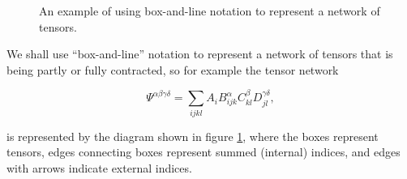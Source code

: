 \documentclass[12pt]{amsbook}
\theoremstyle{plain}
\theoremstyle{definition}
\theoremstyle{remark}
\begin{document}
\begin{figure}
\caption{An example of using box-and-line notation to represent a network of tensors.}
\label{fig:box-line-notation-introduced}
\end{figure}

We shall use ``box-and-line'' notation to represent a network of tensors that is being partly or fully contracted, so for example the tensor network

$$\Psi^{\alpha\beta\gamma\delta} = \sum_{ijkl} A_{i} B_{ijk}^\alpha C_{kl}^\beta D_{jl}^{\gamma\delta},$$

\noindent is represented by the diagram shown in figure \ref{fig:box-line-notation-introduced}, where the boxes represent tensors, edges connecting boxes represent summed (internal) indices, and edges with arrows indicate external indices.
\end{document}
